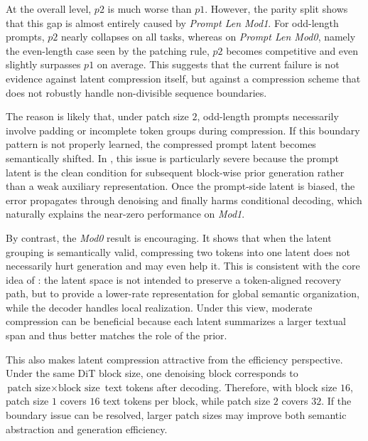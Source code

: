 
At the overall level, $p2$ is much worse than $p1$. However, the parity split shows that this gap is almost entirely caused by \textit{Prompt Len Mod1}. For odd-length prompts, $p2$ nearly collapses on all tasks, whereas on \textit{Prompt Len Mod0}, namely the even-length case seen by the patching rule, $p2$ becomes competitive and even slightly surpasses $p1$ on average. This suggests that the current failure is not evidence against latent compression itself, but against a compression scheme that does not robustly handle non-divisible sequence boundaries.

The reason is likely that, under patch size $2$, odd-length prompts necessarily involve padding or incomplete token groups during compression. If this boundary pattern is not properly learned, the compressed prompt latent becomes semantically shifted. In \method, this issue is particularly severe because the prompt latent is the clean condition for subsequent block-wise prior generation rather than a weak auxiliary representation. Once the prompt-side latent is biased, the error propagates through denoising and finally harms conditional decoding, which naturally explains the near-zero performance on \textit{Mod1}.

By contrast, the \textit{Mod0} result is encouraging. It shows that when the latent grouping is semantically valid, compressing two tokens into one latent does not necessarily hurt generation and may even help it. This is consistent with the core idea of \method: the latent space is not intended to preserve a token-aligned recovery path, but to provide a lower-rate representation for global semantic organization, while the decoder handles local realization. Under this view, moderate compression can be beneficial because each latent summarizes a larger textual span and thus better matches the role of the prior.

This also makes latent compression attractive from the efficiency perspective. Under the same DiT block size, one denoising block corresponds to $\text{patch size} \times \text{block size}$ text tokens after decoding. Therefore, with block size $16$, patch size $1$ covers $16$ text tokens per block, while patch size $2$ covers $32$. If the boundary issue can be resolved, larger patch sizes may improve both semantic abstraction and generation efficiency.

